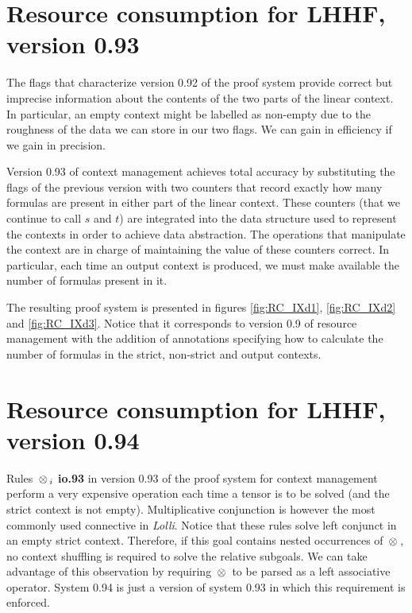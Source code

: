 \hspace*{1em}


\clearpage
\section{Resource consumption for LHHF, version 0.93}
\label{s:RC_IXd}

The flags that characterize version 0.92 of the proof system provide correct
but imprecise information about the contents of the two parts of the linear
context. In particular, an empty context might be labelled as non-empty due
to the roughness of the data we can store in our two flags. We can gain in
efficiency if we gain in precision.

Version 0.93 of context management achieves total accuracy by substituting the
flags of the previous version with two counters that record exactly how many
formulas are present in either part of the linear context. These counters
(that we continue to call $s$ and $t$) are integrated into the data structure
used to represent the contexts in order to achieve data abstraction. The
operations that manipulate the context are in charge of maintaining the value
of these counters correct. In particular, each time an output context is
produced, we must make available the number of formulas present in it.

The resulting proof system is presented in figures \ref{fig:RC_IXd1},
\ref{fig:RC_IXd2} and \ref{fig:RC_IXd3}. Notice that it corresponds to
version 0.9 of resource management with the addition of annotations
specifying how to calculate the number of formulas in the strict, non-strict
and output contexts.


\section{Resource consumption for LHHF, version 0.94}
\label{s:RC_IXe}

Rules {\bf $\, \otimes \,_i$ io.93} in version 0.93 of the proof system for context
management perform a very expensive operation each time a tensor is to be
solved (and the strict context is not empty). Multiplicative conjunction is
however the most commonly used connective in {\em Lolli}. Notice that these
rules solve left conjunct in an empty strict context. Therefore, if this
goal contains nested occurrences of $\, \otimes \,$, no context shuffling is
required to solve the relative subgoals. We can take advantage of this
observation by requiring $\, \otimes \,$ to be parsed as a left associative operator.
System 0.94 is just a version of system 0.93 in which this requirement is
enforced.


